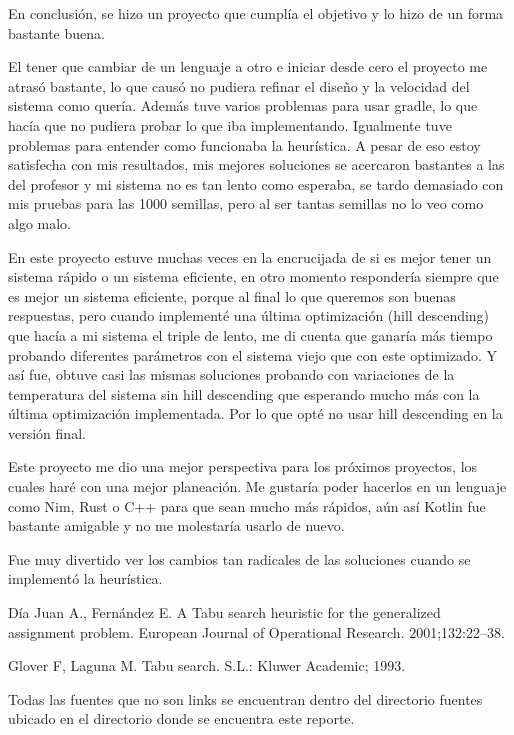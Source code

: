 \documentclass{article}
\begin{document}
En conclusión, se hizo un proyecto que cumplía el objetivo y lo hizo de un forma bastante buena.

El tener que cambiar de un lenguaje a otro e iniciar desde cero el proyecto me atrasó bastante, lo que causó no pudiera refinar el diseño y la velocidad del sistema como quería. Además tuve varios problemas para usar gradle, lo que hacía que no pudiera probar lo que iba implementando. Igualmente tuve problemas para entender como funcionaba la heurística. A pesar de eso estoy satisfecha con mis resultados, mis mejores soluciones se acercaron bastantes a las del profesor y mi sistema no es tan lento como esperaba, se tardo demasiado con mis pruebas para las 1000 semillas, pero al ser tantas semillas no lo veo como algo malo.

En este proyecto estuve muchas veces en la encrucijada de si es mejor tener un sistema rápido o un sistema eficiente, en otro momento respondería siempre que es mejor un sistema eficiente, porque al final lo que queremos son buenas respuestas, pero cuando implementé una última optimización (hill descending) que hacía a mi sistema el triple de lento, me di cuenta que ganaría más tiempo probando diferentes parámetros con el sistema viejo que con este optimizado. Y así fue, obtuve casi las mismas soluciones probando con variaciones de la temperatura del sistema sin hill descending que esperando mucho más con la última optimización implementada. Por lo que opté no usar hill descending en la versión final.

Este proyecto me dio una mejor perspectiva para los próximos proyectos, los cuales haré con una mejor planeación. Me gustaría poder hacerlos en un lenguaje como Nim, Rust o C++ para que sean mucho más rápidos, aún así Kotlin fue bastante amigable y no me molestaría usarlo de nuevo. 

Fue muy divertido ver los cambios tan radicales de las soluciones cuando se implementó la heurística.

\begin{thebibliography}{9}
	Día Juan A., Fernández E. A Tabu search heuristic for the generalized assignment problem. European Journal of Operational Research. 2001;132:22–38.
	  
	Glover F, Laguna M. Tabu search. S.L.: Kluwer Academic; 1993.  
\end{thebibliography}

Todas las fuentes que no son links se encuentran dentro del directorio fuentes ubicado en el directorio donde se encuentra este reporte.
\end{document}
